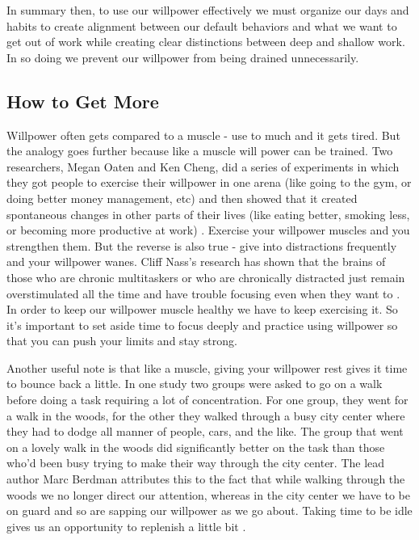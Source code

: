 \documentclass[11pt]{book}
\begin{document}
In summary then, to use our willpower effectively we must organize our days and habits to create alignment between our default behaviors and what we want to get out of work while creating clear distinctions between deep and shallow work. In so doing we prevent our willpower from being drained unnecessarily. 

\subsection{How to Get More}
Willpower often gets compared to a muscle - use to much and it gets tired. But the analogy goes further because like a muscle will power can be trained. Two researchers, Megan Oaten and Ken Cheng, did a series of experiments in which they got people to exercise their willpower in one arena (like going to the gym, or doing better money management, etc) and then showed that it created spontaneous changes in other parts of their lives (like eating better, smoking less, or becoming more productive at work) \cite{duhigg}. Exercise your willpower muscles and you strengthen them. But the reverse is also true - give into distractions frequently and your willpower wanes. Cliff Nass's research has shown that the brains of those who are chronic multitaskers or who are chronically distracted just remain overstimulated all the time and have trouble focusing even when they want to \cite{newport}. In order to keep our willpower muscle healthy we have to keep exercising it. So it's important to set aside time to focus deeply and practice using willpower so that you can push your limits and stay strong.
\newline

Another useful note is that like a muscle, giving your willpower rest gives it time to bounce back a little. In one study two groups were asked to go on a walk before doing a task requiring a lot of concentration. For one group, they went for a walk in the woods, for the other they walked through a busy city center where they had to dodge all manner of people, cars, and the like. The group that went on a lovely walk in the woods did significantly better on the task than those who'd been busy trying to make their way through the city center. The lead author Marc Berdman attributes this to the fact that while walking through the woods we no longer direct our attention, whereas in the city center we have to be on guard and so are sapping our willpower as we go about. Taking time to be idle gives us an opportunity to replenish a little bit \cite{newport}.
\newline
\end{document}
